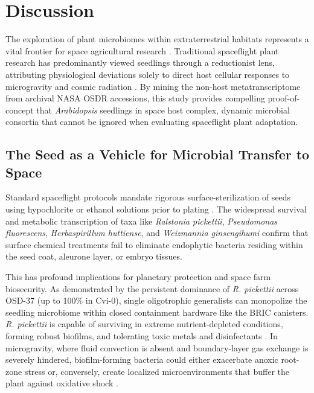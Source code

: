 \section{Discussion}
\label{sec:discussion}

The exploration of plant microbiomes within extraterrestrial habitats represents a vital frontier for space agricultural research \citep{fu2016how}. Traditional spaceflight plant research has predominantly viewed seedlings through a reductionist lens, attributing physiological deviations solely to direct host cellular responses to microgravity and cosmic radiation \citep{paul2017genetic,choi2019variation}. By mining the non-host metatranscriptome from archival NASA OSDR accessions, this study provides compelling proof-of-concept that \textit{Arabidopsis} seedlings in space host complex, dynamic microbial consortia that cannot be ignored when evaluating spaceflight plant adaptation.

\subsection{The Seed as a Vehicle for Microbial Transfer to Space}
Standard spaceflight protocols mandate rigorous surface-sterilization of seeds using hypochlorite or ethanol solutions prior to plating \citep{dixit2021persistence}. The widespread survival and metabolic transcription of taxa like \textit{Ralstonia pickettii}, \textit{Pseudomonas fluorescens}, \textit{Herbaspirillum huttiense}, and \textit{Weizmannia ginsengihumi} confirm that surface chemical treatments fail to eliminate endophytic bacteria residing within the seed coat, aleurone layer, or embryo tissues.

This has profound implications for planetary protection and space farm biosecurity. As demonstrated by the persistent dominance of \textit{R. pickettii} across OSD-37 (up to 100\% in Cvi-0), single oligotrophic generalists can monopolize the seedling microbiome within closed containment hardware like the BRIC canisters. \textit{R. pickettii} is capable of surviving in extreme nutrient-depleted conditions, forming robust biofilms, and tolerating toxic metals and disinfectants \citep{segata2012metagenomic}. In microgravity, where fluid convection is absent and boundary-layer gas exchange is severely hindered, biofilm-forming bacteria could either exacerbate anoxic root-zone stress or, conversely, create localized microenvironments that buffer the plant against oxidative shock \citep{barker2023meta}.

